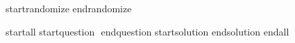startrandomize  endrandomize


startall startquestion $ $  endquestion startsolution endsolution endall
